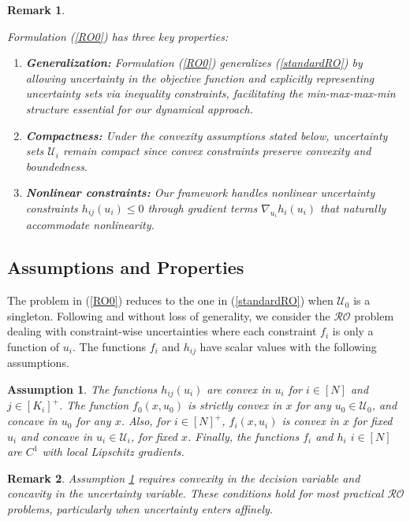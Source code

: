 \documentclass[journal,twoside,web]{ieeecolor}
\newcommand{\rev}[1]{\textcolor{revisionblue}{#1}}
\newtheorem{assumption}[theorem]{Assumption}
\newtheorem{remark}{Remark}
\begin{document}
\begin{remark} \rev{Formulation (\ref{RO0}) has three key properties:
\begin{enumerate}
\item \textbf{Generalization:} Formulation (\ref{RO0}) generalizes (\ref{standardRO}) by allowing uncertainty in the objective function and explicitly representing uncertainty sets via inequality constraints, facilitating the min-max-max-min structure essential for our dynamical approach.
\item \textbf{Compactness:} Under the convexity assumptions stated below, uncertainty sets $\mathcal{U}_i$ remain compact since convex constraints preserve convexity and boundedness.
\item \textbf{Nonlinear constraints:} Our framework handles nonlinear uncertainty constraints $h_{ij}(u_i) \leq 0$ through gradient terms $\nabla_{u_i} h_i(u_i)$ that naturally accommodate nonlinearity.
\end{enumerate}}
\end{remark}

\subsection*{\rev{Assumptions and Properties}}

The problem in (\ref{RO0}) reduces to the one in (\ref{standardRO}) when $\mathcal{U}_0$ is a singleton.
Following \cite{bental2009-2} and without loss of generality, we consider the $\mathcal{RO}$ problem dealing with constraint-wise uncertainties where each constraint $f_i$ is only a function of $u_i$.
The functions $f_i$ and $h_{ij}$ have scalar values with the following assumptions.

\begin{assumption}\label{assume1} The functions $h_{ij}(u_i)$ are convex in $u_i$ for $i\in[N]$ and $j\in[K_i]^+$.
The function $f_0(x,u_0)$ is strictly convex in $x$ for any $u_0\in \mathcal{U}_0$, and concave in $u_0$ for any $x$. Also, for $i\in[N]^+$, $f_i(x,u_i)$ is convex in $x$ for fixed $u_i$ and concave in $u_i\in \mathcal{U}_i$, for fixed $x$.
Finally, the functions $f_i$ and $h_i$ $i\in[N]$ are $C^1$ with local Lipschitz gradients.
\end{assumption}

\begin{remark}
Assumption \ref{assume1} requires convexity in the decision variable and concavity in the uncertainty variable. These conditions hold for most practical $\mathcal{RO}$ problems, particularly when uncertainty enters affinely.
\end{remark}
\end{document}
